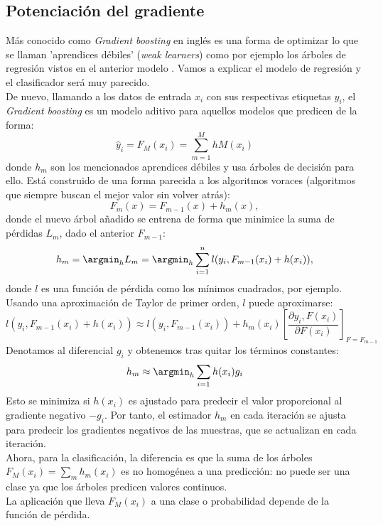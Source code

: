 \subsection{Potenciación del gradiente}
Más conocido como \textit{Gradient boosting} en inglés es una forma de optimizar lo que se llaman 'aprendices débiles' (\textit{weak learners}) como por ejemplo los árboles de regresión vistos en el anterior modelo  \cite{scikit2021gb}. Vamos a explicar el modelo de regresión y el clasificador será muy parecido.\\
De nuevo, llamando a los datos de entrada $x_i$ con sus respectivas etiquetas $y_i$, el \textit{Gradient boosting} es un modelo aditivo para aquellos modelos que predicen de la forma:
\[ \hat{y}_i = F_M(x_i)=\sum_{m=1}^M hM(x_i) \]
donde $h_m$ son los mencionados aprendices débiles y usa árboles de decisión para ello. Está construido de una forma parecida a los algoritmos voraces (algoritmos que siempre buscan el mejor valor sin volver atrás):
\[ F_m(x)=F_{m-1}(x)+ h_m(x), \]
donde el nuevo árbol añadido se entrena de forma que minimice la suma de pérdidas $L_m$, dado el anterior $F_{m-1}$:
\[ h_m=\argmin_h L_m=\argmin_h \sum_{i=1}^n l(y_i,F_{m-1}(x_i)+h(x_i)), \]
donde $l$ es una función de pérdida como los mínimos cuadrados, por ejemplo.\\
Usando una aproximación de Taylor de primer orden, $l$ puede aproximarse:
\[ l(y_i,F_{m-1}(x_i)+h(x_i)) \approx l(y_i,F_{m-1}(x_i)) + h_m(x_i) \left[ \frac{\partial y_i, F(x_i)}{\partial F(x_i)} \right]_{F=F_{m-1}} \]
Denotamos al diferencial $g_i$ y obtenemos tras quitar los términos constantes:
\[ h_m \approx \argmin_h \sum_{i=1} h(x_i)g_i \]
Esto se minimiza si $h(x_i)$ es ajustado para predecir el valor proporcional al gradiente negativo $-g_i$. Por tanto, el estimador $h_m$ en cada iteración se ajusta para predecir los gradientes negativos de las muestras, que se actualizan en cada iteración.\\
Ahora, para la clasificación, la diferencia es que la suma de los árboles $F_M(x_i)=\sum_m h_m (x_i)$ es no homogénea a una predicción: no puede ser una clase ya que los árboles predicen valores continuos.\\
La aplicación que lleva $F_M(x_i)$ a una clase o probabilidad depende de la función de pérdida. \cite{scikit2021gb}

